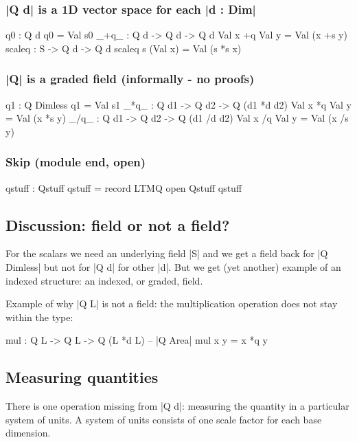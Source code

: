 \documentclass{article}
\begin{document}
\subsubsection{|Q d| is a 1D vector space for each |d : Dim|}
\label{sec:orgf183c4d}
\begin{code}
    q0 : Q d
    q0 = Val s0
    _+q_ : Q d  -> Q d  -> Q d
    Val x +q Val y = Val (x +s y)
    scaleq : S -> Q d -> Q d
    scaleq s (Val x) = Val (s *s x)
\end{code}
\subsubsection{|Q| is a graded field (informally - no proofs)}
\label{sec:orgb5405e9}
\begin{code}
    q1  : Q Dimless
    q1 = Val s1
    _*q_ : Q d1 -> Q d2 -> Q (d1 *d d2)
    Val x *q Val y = Val (x *s y)
    _/q_ : Q d1 -> Q d2 -> Q (d1 /d d2)
    Val x /q Val y = Val (x /s y)
\end{code}
\subsubsection{Skip (module end, open)}
\label{sec:orgcc8d37a}
\begin{code}
  qstuff : Qstuff
  qstuff = record { LTMQ }
  open Qstuff qstuff
\end{code}

\subsection{Discussion: field or not a field?}
\label{sec:orgb7e65ef}
For the scalars we need an underlying field |S| and we get a field
back for |Q Dimless| but not for |Q d| for other |d|. But we get (yet
another) example of an indexed structure: an indexed, or graded, field.

Example of why |Q L| is not a field: the multiplication operation
does not stay within the type:

\begin{code}
  mul : Q L -> Q L -> Q (L *d L) -- |Q Area|
  mul x y = x *q y
\end{code}

\subsection{Measuring quantities}
\label{sec:org89b80dd}

There is one operation missing from |Q d|: measuring the quantity in a
particular system of units. A system of units consists of one scale
factor for each base dimension.
\end{document}
